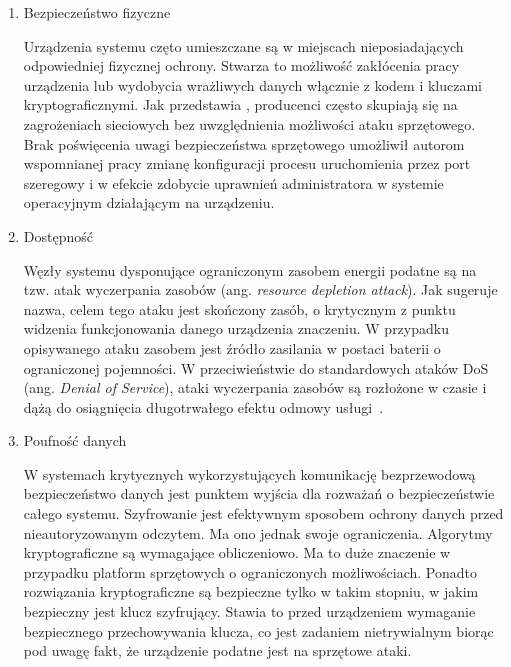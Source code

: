 		\begin{enumerate}[label=\Alph*.]
			\item Bezpieczeństwo fizyczne

				Urządzenia systemu częto umieszczane są w miejscach nieposiadających odpowiedniej fizycznej ochrony. Stwarza to możliwość zakłócenia pracy urządzenia lub wydobycia wrażliwych danych włącznie z kodem i kluczami kryptograficznymi. Jak przedstawia \cite{iot-hardware-attack}, producenci często skupiają się na zagrożeniach sieciowych bez uwzględnienia możliwości ataku sprzętowego. Brak poświęcenia uwagi bezpieczeństwa sprzętowego umożliwił autorom wspomnianej pracy zmianę konfiguracji procesu uruchomienia przez port szeregowy i w efekcie zdobycie uprawnień administratora w systemie operacyjnym działającym na urządzeniu.

			\item Dostępność

				Węzły systemu dysponujące ograniczonym zasobem energii podatne są na tzw. atak wyczerpania zasobów (ang. \textit{resource depletion attack}). Jak sugeruje nazwa, celem tego ataku jest skończony zasób, o krytycznym z punktu widzenia funkcjonowania danego urządzenia znaczeniu. W przypadku opisywanego ataku zasobem jest źródło zasilania w postaci baterii o ograniczonej pojemności. W przeciwieństwie do standardowych ataków DoS (ang. \textit{Denial of Service}), ataki wyczerpania zasobów są rozłożone w czasie i dążą do osiągnięcia długotrwałego efektu odmowy usługi~\cite{iot-rd-attack}.

			\item Poufność danych

				W systemach krytycznych wykorzystujących komunikację bezprzewodową bezpieczeństwo danych jest punktem wyjścia dla rozważań o bezpieczeństwie całego systemu. Szyfrowanie jest efektywnym sposobem ochrony danych przed nieautoryzowanym odczytem. Ma ono jednak swoje ograniczenia. Algorytmy kryptograficzne są wymagające obliczeniowo. Ma to duże znaczenie w przypadku platform sprzętowych o ograniczonych możliwościach. Ponadto rozwiązania kryptograficzne są bezpieczne tylko w takim stopniu, w jakim bezpieczny jest klucz szyfrujący. Stawia to przed urządzeniem wymaganie bezpiecznego przechowywania klucza, co jest zadaniem nietrywialnym biorąc pod uwagę fakt, że urządzenie podatne jest na sprzętowe ataki.

		\end{enumerate}